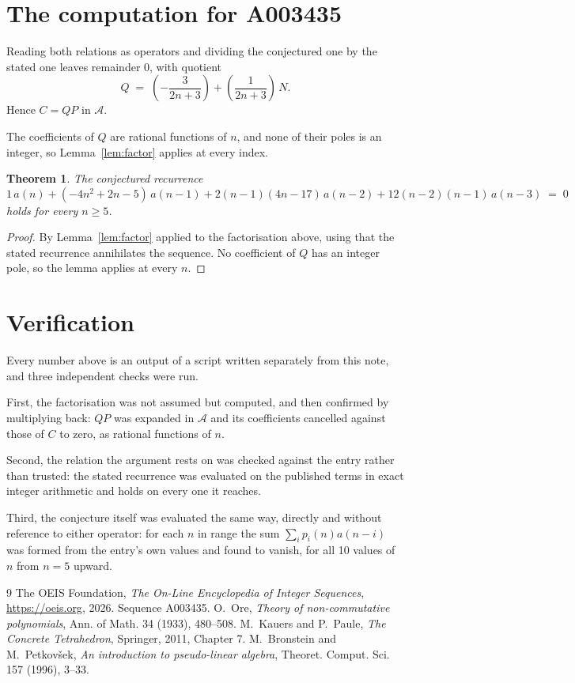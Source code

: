 \documentclass[11pt,a4paper]{article}
\theoremstyle{plain}
\newtheorem{theorem}{Theorem}
\theoremstyle{definition}
\begin{document}
\section{The computation for A003435}

Reading both relations as operators and dividing the conjectured one by the stated one
leaves remainder $0$, with quotient
\[
Q \;=\; \left(- \frac{3}{2 n + 3}\right) + \left(\frac{1}{2 n + 3}\right)\,N .
\]
Hence $C=QP$ in $\mathcal{A}$.

The coefficients of $Q$ are rational functions of $n$, and none of their poles is an integer, so Lemma~\ref{lem:factor} applies at every index.

\begin{theorem}
The conjectured recurrence
\[
1\,a(n) + (- 4 n^{2} + 2 n - 5)\,a(n-1) + 2 \left(n - 1\right) \left(4 n - 17\right)\,a(n-2) + 12 \left(n - 2\right) \left(n - 1\right)\,a(n-3) \;=\;0
\]
holds for every $n\ge5$.
\end{theorem}

\begin{proof}
By Lemma~\ref{lem:factor} applied to the factorisation above, using that the stated
recurrence annihilates the sequence. No coefficient of $Q$ has an integer pole, so the lemma applies at every $n$.
\end{proof}

\section{Verification}

Every number above is an output of a script written separately from this note, and three
independent checks were run.

First, the factorisation was not assumed but computed, and then confirmed by multiplying
back: $QP$ was expanded in $\mathcal{A}$ and its coefficients cancelled against those of
$C$ to zero, as rational functions of $n$.

Second, the relation the argument rests on was checked against the entry rather than
trusted: the stated recurrence was evaluated on the published terms in exact integer
arithmetic and holds on every one it reaches.

Third, the conjecture itself was evaluated the same way, directly and without reference to
either operator: for each $n$ in range the sum $\sum_{i}p_{i}(n)a(n-i)$ was formed from the
entry's own values and found to vanish, for all 10 values of $n$ from
$n=5$ upward.

\begin{thebibliography}{9}
 The OEIS Foundation, \emph{The On-Line Encyclopedia of Integer Sequences},
\url{https://oeis.org}, 2026. Sequence A003435.
 O.~Ore, \emph{Theory of non-commutative polynomials}, Ann. of Math. 34
(1933), 480--508.
 M.~Kauers and P.~Paule, \emph{The Concrete Tetrahedron}, Springer, 2011,
Chapter 7.
 M.~Bronstein and M.~Petkov\v{s}ek, \emph{An introduction to
pseudo-linear algebra}, Theoret. Comput. Sci. 157 (1996), 3--33.
\end{thebibliography}
\end{document}
